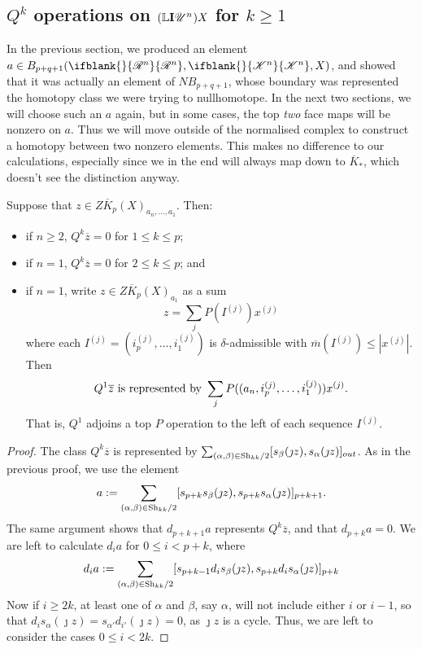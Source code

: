 \documentclass[11pt]{article}
\newcommand{\PRLie}[1]{\scrR^{#1}}%
\newcommand{\LL}[1]{{\scrK}^{#1}}%
\newcommand{\nontop}[1]{\scrU^{#1}}%
\newcommand{\Ind}[2][]{\mathbf{I}{#2}_{#1}}%
\newcommand{\Fr}[2][]{\ifblank{#1}{#2}{#2_{#1}}}
\newcommand{\derived}{\mathbb{L}}
\renewcommand{\Q}{Q}
\newcommand{\minDimP}{\overline{m}}
\newcommand{\HalfShuffles}[2]{\textup{Sh}_{#1#2}/2}
\begin{document}
\begin{LieLambdaStructureOnKoszul}
\subsection{$\Q^k$ operations on $(\derived\Ind{\nontop{n}})X$ for $k\geq1$}
In the previous section, we produced an element $a\in B_{p+q+1}(\Fr{\PRLie{n}},\Fr{\LL{n}},X)$, and showed that it was actually an element of $NB_{p+q+1}$, whose boundary was represented the homotopy class we were trying to nullhomotope. In the next two sections, we will choose such an $a$ again, but in some cases, the top \emph{two} face maps will be nonzero on $a$. Thus we will move outside of the normalised complex to construct a homotopy between two nonzero elements. This makes no difference to our calculations, especially since we in the end will always map down to $\overline{K}_*$, which doesn't see the distinction anyway.
\begin{prop*}
Suppose that $z\in Z\overline{K}_p(X)_{a_n,\ldots,a_1}$. Then:
\begin{itemize}\squishlist
\setlength{\parindent}{.25in}
\item  if $n\geq2$, $\Q^k\overline{z}=0$ for $1\leq k\leq p$;
\item  if $n=1$, $\Q^k\overline{z}=0$ for $2\leq k\leq p$; and
\item if $n=1$, write $z\in Z\overline{K}_p(X)_{a_1}$ as a sum 
\[z=\sum_{j}P(I^{(j)})x^{(j)}\]
where each $I^{(j)}=(i_p^{(j)},\ldots,i_1^{(j)})$ is $\delta$-admissible with $\minDimP(I^{(j)})\leq |x^{(j)}|$. Then
\[\Q^1\overline{z}\textup{ is represented by }\sum_{j}P((a_{n},i_p^{(j)},\ldots,i_1^{(j)}))x^{(j)}.\]
That is, $\Q^1$ adjoins a top $P$ operation to the left of each sequence $I^{(j)}$.
\end{itemize}
\end{prop*}
\begin{proof}
The class $\Q^k\overline{z}$ is represented by $\sum_{(\alpha,\beta)\in\HalfShuffles{k}{k}}[s_\beta(\jmath z), s_\alpha(\jmath z)]_{out}$. As in the previous proof, we use the element
\[a:=\sum_{(\alpha,\beta)\in\HalfShuffles{k}{k}}[s_{p+k}s_\beta(\jmath z), s_{p+k}s_\alpha(\jmath z)]_{p+k+1}.\]
The same argument shows that $d_{p+k+1}a$ represents $\Q^k\overline{z}$, and that $d_{p+k}a=0$. We are left to calculate $d_ia$ for $0\leq i<p+k$, where 
\[d_ia:=\sum_{(\alpha,\beta)\in\HalfShuffles{k}{k}}[s_{p+k-1}d_is_\beta(\jmath z), s_{p+k}d_is_\alpha(\jmath z)]_{p+k}\]
Now if $i\geq 2k$, at least one of $\alpha$ and $\beta$, say $\alpha$, will not include either $i$ or $i-1$, so that $d_is_\alpha(\jmath z)=s_{\alpha'}d_{i'}(\jmath z)=0$, as $\jmath z$ is a cycle. Thus, we are left to consider the cases $0\leq i< 2k$.


\end{proof}
\end{LieLambdaStructureOnKoszul}
\end{document}

